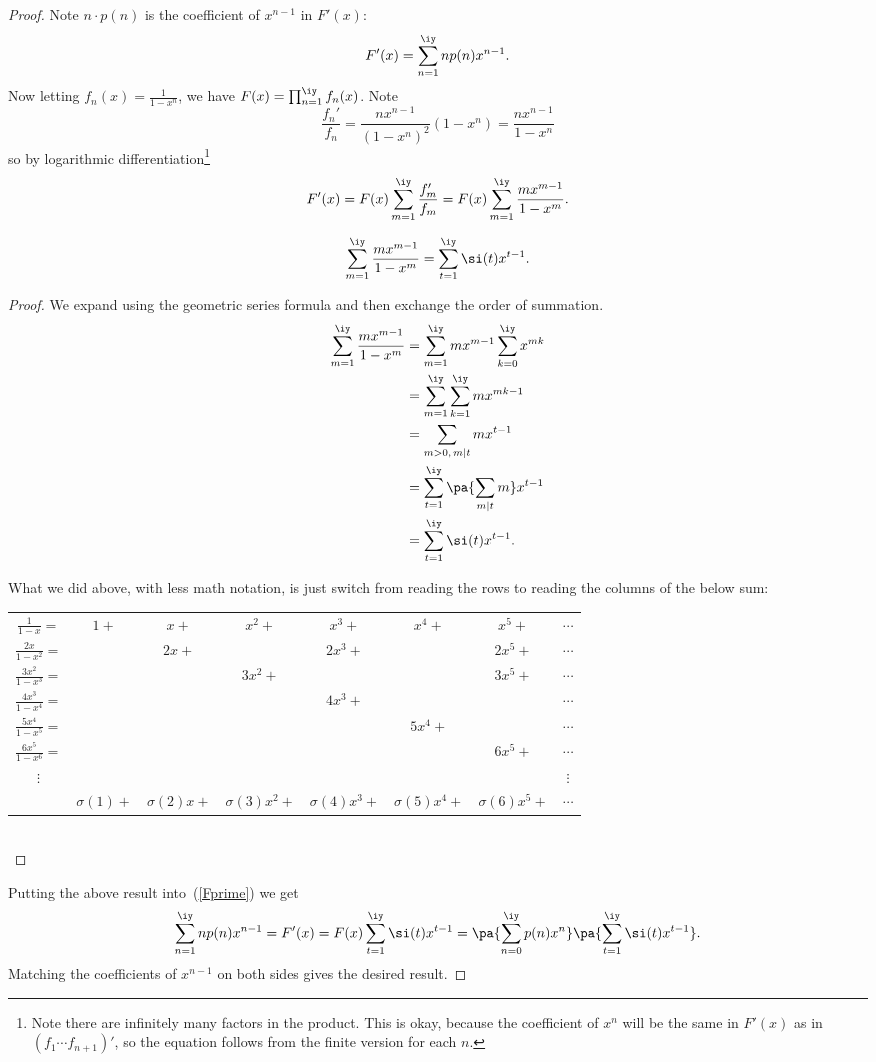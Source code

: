 \begin{proof}
Note $n\cdot p(n)$ is the coefficient of $x^{n-1}$ in $F'(x)$:
\[
F'(x)=\sum_{n=1}^{\iy}n p(n)x^{n-1}.
\]
Now letting $f_n(x)=\frac{1}{1-x^n}$, we have $F(x)=\prod_{n=1}^{\iy}f_n(x)$. Note
\[
\frac{f_n'}{f_n}
=\frac{nx^{n-1}}{(1-x^n)^2} (1-x^n)=\frac{nx^{n-1}}{1-x^n}
\]
so by logarithmic differentiation\footnote{Note there are infinitely many factors in the product. This is okay, because the coefficient of $x^n$ will be the same in $F'(x)$ as in $(f_1\cdots f_{n+1})'$, so the equation follows from the finite version for each $n$.}
\begin{equation}\label{Fprime}
F'(x)=F(x)\sum_{m=1}^{\iy} \frac{f_m'}{f_m}=F(x)\sum_{m=1}^{\iy}\frac{mx^{m-1}}{1-x^m}.
\end{equation}
\begin{clm}
\[
\sum_{m=1}^{\iy}\frac{mx^{m-1}}{1-x^m}=\sum_{t=1}^{\iy} \si(t)x^{t-1}.
\]
\end{clm}
\begin{proof}
We expand using the geometric series formula and then exchange the order of summation.
\begin{align*}
\sum_{m=1}^{\iy}\frac{mx^{m-1}}{1-x^m}&=\sum_{m=1}^{\iy} mx^{m-1} \sum_{k=0}^{\iy} x^{mk}\\
&=\sum_{m=1}^{\iy} \sum_{k=1}^{\iy} mx^{mk-1}\\
&=\sum_{m>0,\,m\mid t} mx^{t-1}\\
&=\sum_{t=1}^{\iy} \pa{\sum_{m|t} m}x^{t-1}\\
&=\sum_{t=1}^{\iy} \si(t)x^{t-1}.
\end{align*}

What we did above, with less math notation, is just switch from reading the rows to reading the columns of the below sum:\\

\noindent \begin{tabular}{cccccccc}
$\frac{1}{1-x}=$ & $1+$ & $x+$ & $x^{2}+$ & $x^{3}+$ & $x^{4}+$ & $x^{5}+$ & $\cdots$\tabularnewline
$\frac{2x}{1-x^{2}}=$ &  & $2x+$ &  & $2x^{3}+$ &  & $2x^{5}+$ & $\cdots$\tabularnewline
$\frac{3x^{2}}{1-x^{3}}=$ &  &  & $3x^{2}+$ &  &  & $3x^{5}+$ & $\cdots$\tabularnewline
$\frac{4x^{3}}{1-x^{4}}=$ &  &  &  & $4x^{3}+$ &  &  & $\cdots$\tabularnewline
$\frac{5x^{4}}{1-x^{5}}=$ &  &  &  &  & $5x^{4}+$ &  & $\cdots$\tabularnewline
$\frac{6x^{5}}{1-x^{6}}=$ &  &  &  &  &  & $6x^{5}+$ & $\cdots$\tabularnewline
$\vdots$ &  &  &  &  &  &  & $\vdots$\tabularnewline
\hline
 & $\sigma(1)+$ & $\sigma(2)x+$ & $\sigma(3)x^{2}+$ & $\sigma(4)x^{3}+$ & $\sigma(5)x^{4}+$ & $\sigma(6)x^{5}+$ & $\cdots$\tabularnewline
\end{tabular}\\
\end{proof}
Putting the above result into~(\ref{Fprime}) we get
\[
\sum_{n=1}^{\iy} np(n)x^{n-1}=F'(x)=F(x)\sum_{t=1}^{\iy} \si(t)x^{t-1}=\pa{\sum_{n=0}^{\iy} p(n)x^n}
\pa{\sum_{t=1}^{\iy} \si(t)x^{t-1}}.
\]
Matching the coefficients of $x^{n-1}$ on both sides gives the desired result.
\end{proof}

